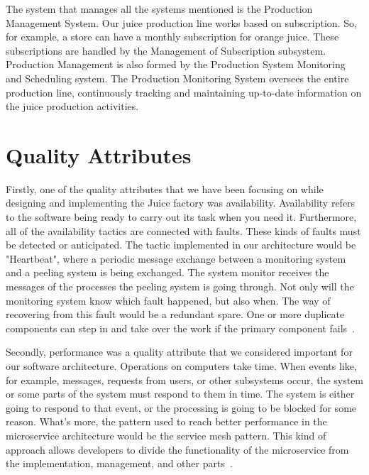 \documentclass[conference]{IEEEtran}
\begin{document}
The system that manages all the systems mentioned is the Production Management System. Our juice production line works based on subscription. So, for example, a store can have a monthly subscription for orange juice. These subscriptions are handled by the Management of Subscription subsystem. Production Management is also formed by the Production System Monitoring and Scheduling system. The Production Monitoring System oversees the entire production line, continuously tracking and maintaining up-to-date information on the juice production activities. 



\section{Quality Attributes}


\color{black}
Firstly, one of the quality attributes that we have been focusing on while designing and implementing the Juice factory was availability. Availability refers to the software being ready to carry out its task when you need it. Furthermore, all of the availability tactics are connected with faults. These kinds of faults must be detected or anticipated. The tactic implemented in our architecture would be "Heartbeat", where a periodic message exchange between a monitoring system and a peeling system is being exchanged. The system monitor receives the messages of the processes the peeling system is going through. Not only will the monitoring system know which fault happened, but also when. The way of recovering from this fault would be a redundant spare. One or more duplicate components can step in and take over the work if the primary component fails~\cite{b1}.

Secondly, performance was a quality attribute that we considered important for our software architecture. Operations on computers take time. When events like, for example, messages, requests from users, or other subsystems occur, the system or some parts of the system must respond to them in time. The system is either going to respond to that event, or the processing is going to be blocked for some reason. What's more, the pattern used to reach better performance in the microservice architecture would be the service mesh pattern. This kind of approach allows developers to divide the functionality of the microservice from the implementation, management, and other parts~\cite{b1}. 
\end{document}
